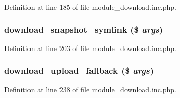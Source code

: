 Definition at line 185 of file module\_\-download.inc.php.

\hypertarget{module__download_8inc_8php_ae1b136740fb3c1fe26820e1982f8d353}{
\subsubsection[{download\_\-snapshot\_\-symlink}]{\setlength{\rightskip}{0pt plus 5cm}download\_\-snapshot\_\-symlink (\$ {\em args})}}
\label{module__download_8inc_8php_ae1b136740fb3c1fe26820e1982f8d353}


Definition at line 203 of file module\_\-download.inc.php.

\hypertarget{module__download_8inc_8php_a678bcaf9018d772881b4291020894fa0}{
\subsubsection[{download\_\-upload\_\-fallback}]{\setlength{\rightskip}{0pt plus 5cm}download\_\-upload\_\-fallback (\$ {\em args})}}
\label{module__download_8inc_8php_a678bcaf9018d772881b4291020894fa0}


Definition at line 238 of file module\_\-download.inc.php.

